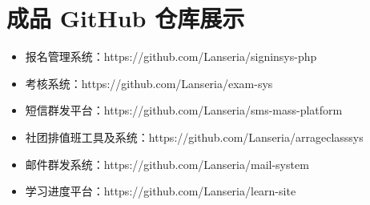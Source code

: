 \chapter{成品 GitHub 仓库展示}

\begin{itemize}
  \item 报名管理系统：https://github.com/Lanseria/signinsys-php
  \item 考核系统：https://github.com/Lanseria/exam-sys
  \item 短信群发平台：https://github.com/Lanseria/sms-mass-platform
  \item 社团排值班工具及系统：https://github.com/Lanseria/arrageclasssys
  \item 邮件群发系统：https://github.com/Lanseria/mail-system
  \item 学习进度平台：https://github.com/Lanseria/learn-site
\end{itemize}
